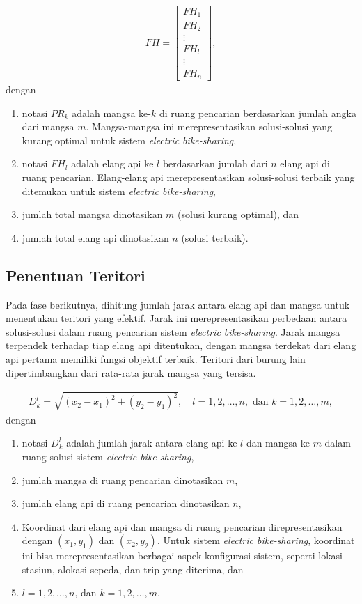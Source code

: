 \begin{align}
    FH = \begin{bmatrix}
        FH_1\\
        FH_2\\
        \vdots\\
        FH_l\\
        \vdots\\
        FH_n
    \end{bmatrix},
\end{align}
dengan
\begin{enumerate}
    \item notasi $PR_k$ adalah mangsa ke-$k$ di ruang pencarian berdasarkan jumlah angka dari mangsa $m$. Mangsa-mangsa ini merepresentasikan solusi-solusi yang kurang optimal untuk sistem \textit{electric bike-sharing},
    \item notasi $FH_l$ adalah elang api ke $l$ berdasarkan jumlah dari $n$ elang api di ruang pencarian. Elang-elang api merepresentasikan solusi-solusi terbaik yang ditemukan untuk sistem \textit{electric bike-sharing},
    \item jumlah total mangsa dinotasikan $m$ (solusi kurang optimal), dan
    \item jumlah total elang api dinotasikan $n$ (solusi terbaik).
\end{enumerate}

\subsection{Penentuan Teritori}
Pada fase berikutnya, dihitung jumlah jarak antara elang api dan mangsa untuk menentukan teritori yang efektif. Jarak ini merepresentasikan perbedaan antara solusi-solusi dalam ruang pencarian sistem \textit{electric bike-sharing}. Jarak mangsa terpendek terhadap tiap elang api ditentukan, dengan mangsa terdekat dari elang api pertama memiliki fungsi objektif terbaik. Teritori dari burung lain dipertimbangkan dari rata-rata jarak mangsa yang tersisa.

\begin{align}
    D_k^l = \sqrt{(x_2-x_1)^2+(y_2-y_1)^2}, 
    \quad l = 1, 2, \ldots, n,  \text{ dan } k = 1, 2, \ldots, m,
\end{align}
dengan
\begin{enumerate}
    \item notasi $D_k^l$ adalah jumlah jarak antara elang api ke-$l$ dan mangsa ke-$m$ dalam ruang solusi sistem \textit{electric bike-sharing},
    \item jumlah mangsa di ruang pencarian dinotasikan $m$,
    \item jumlah elang api di ruang pencarian dinotasikan $n$, 
    \item Koordinat dari elang api dan mangsa di ruang pencarian direpresentasikan dengan $(x_1,y_1)$ dan $(x_2,y_2)$. Untuk sistem \textit{electric bike-sharing}, koordinat ini bisa merepresentasikan berbagai aspek konfigurasi sistem, seperti lokasi stasiun, alokasi sepeda, dan trip yang diterima, dan
    \item $l=1,2,\ldots, n$, dan $k=1,2, \ldots, m$.
\end{enumerate}

